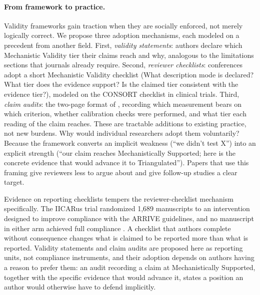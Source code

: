 \documentclass{article}
\begin{document}
\paragraph{From framework to practice.}
Validity frameworks gain traction when they are socially enforced, not merely logically correct. We propose three adoption mechanisms, each modeled on a precedent from another field. First, \emph{validity statements}: authors declare which Mechanistic Validity tier their claims reach and why, analogous to the limitations sections that journals already require. Second, \emph{reviewer checklists}: conferences adopt a short Mechanistic Validity checklist (What description mode is declared? What tier does the evidence support? Is the claimed tier consistent with the evidence tier?), modeled on the CONSORT checklist in clinical trials. Third, \emph{claim audits}: the two-page format of , recording which measurement bears on which criterion, whether calibration checks were performed, and what tier each reading of the claim reaches. These are tractable additions to existing practice, not new burdens. Why would individual researchers adopt them voluntarily? Because the framework converts an implicit weakness (``we didn't test X'') into an explicit strength (``our claim reaches Mechanistically Supported; here is the concrete evidence that would advance it to Triangulated''). Papers that use this framing give reviewers less to argue about and give follow-up studies a clear target.

Evidence on reporting checklists tempers the reviewer-checklist mechanism specifically. The IICARus trial randomized 1{,}689 manuscripts to an intervention designed to improve compliance with the ARRIVE guidelines, and no manuscript in either arm achieved full compliance \citep{hair2019randomised}. A checklist that authors complete without consequence changes what is claimed to be reported more than what is reported. Validity statements and claim audits are proposed here as reporting units, not compliance instruments, and their adoption depends on authors having a reason to prefer them: an audit recording a claim at Mechanistically Supported, together with the specific evidence that would advance it, states a position an author would otherwise have to defend implicitly.
\end{document}
